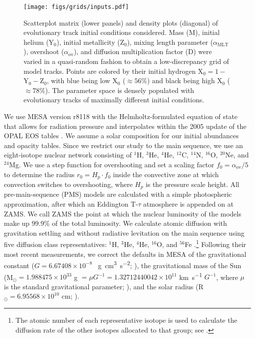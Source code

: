 \documentclass[twocolumn,twocolappendix]{aastex6}
\begin{document}
\begin{figure*}
    \centering
    \texttt{[image: figs/grids/inputs.pdf]}
    \caption{Scatterplot matrix (lower panels) and density plots (diagonal) of evolutionary track initial conditions considered. Mass (M), initial helium (Y$_0$), initial metallicity (Z$_0$), mixing length parameter ($\alpha_{\text{MLT}}$), overshoot ($\alpha_{\text{ov}}$), and diffusion multiplication factor (D) were varied in a quasi-random fashion to obtain a low-discrepancy grid of model tracks. Points are colored by their initial hydrogen X$_0=1-$Y$_0-$Z$_0$, with blue being low X$_0$ ($\approx 56\%$) and black being high X$_0$ ($\approx 78\%$). The parameter space is densely populated with evolutionary tracks of maximally different initial conditions. }
    \label{fig:inputs}
\end{figure*}

We use MESA version r8118 with the Helmholtz-formulated equation of state that allows for radiation pressure and interpolates within the 2005 update of the OPAL EOS tables \citep{2002ApJ...576.1064R}. We assume a \citet{1998SSRv...85..161G} solar composition for our initial abundances and opacity tables. Since we restrict our study to the main sequence, we use an eight-isotope nuclear network consisting of $^1$H, $^3$He, $^4$He, $^{12}$C, $^{14}$N, $^{16}$O, $^{20}$Ne, and $^{24}$Mg. We use a step function for overshooting and set a scaling factor $f_0 = \alpha_{\text{ov}}/5$ to determine the radius $r_0 = H_p \cdot f_0$ inside the convective zone at which convection switches to overshooting, where $H_p$ is the pressure scale height. %
All pre-main-sequence (PMS) models are calculated with a simple photospheric approximation, after which an Eddington T-$\tau$ atmosphere is appended on at ZAMS. We call ZAMS the point at which the nuclear luminosity of the models make up 99.9\% of the total luminosity. We calculate atomic diffusion with gravitation settling and without radiative levitation on the main sequence using five diffusion class representatives: $^1$H, $^3$He, $^4$He, $^{16}$O, and $^{56}$Fe \citep{burgers1969flow}.\footnote{The atomic number of each representative isotope is used to calculate the diffusion rate of the other isotopes allocated to that group; see \citet{Paxton2011}.} 
Following their most recent measurements, we correct the defaults in MESA of the gravitational constant ($G=6.67408\times 10^{-8}$ \si{\per\g\cm\cubed\per\square\s}; \citealt{2015arXiv150707956M}), the gravitational mass of the Sun (M$_\odot = 1.988475\times 10^{33}$ \si{\g} $= \mu G^{-1} = 1.32712440042\times 10^{11}$ \si{\km\per\s} $G^{-1}$, where $\mu$ is the standard gravitational parameter; \citealt{pitjeva2015determination}), and the solar radius (R$_\odot = 6.95568\times 10^{10}$ \si{\cm}; \citealt{2008ApJ...675L..53H}). 
\end{document}
